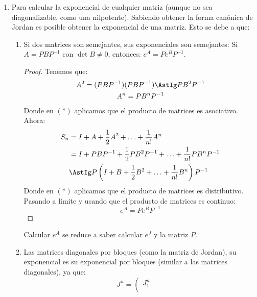 \begin{enumerate}
    \item Para calcular la exponencial de cualquier matriz (aunque no sea diagonalizable, como una nilpotente). Sabiendo obtener la forma canónica de Jordan es posible obtener la exponencial de una matriz. Esto se debe a que:
        \begin{enumerate}
            \item Si dos matrices son semejantes, sus exponenciales son semejantes:
                Si $A = PBP^{-1}$ con $\det B \neq 0$, entonces: $e^A = Pe^BP^{-1}$.



                \begin{proof}
                    Tenemos que:
                    \begin{gather*}
                        A^2 = (PBP^{-1})(PBP^{-1}) \AstIg PB^2 P^{-1} \\
                        A^n = PB^n P^{-1}
                    \end{gather*}
                    Donde en $(\ast)$ aplicamos que el producto de matrices es asociativo. Ahora:
                    \begin{align*}
                        S_n &= I + A + \dfrac{1}{2}A^2 + \ldots + \dfrac{1}{n!} A^n \\
                            &= I + PBP^{-1} + \dfrac{1}{2} PB^2P^{-1} + \ldots + \dfrac{1}{n!}PB^nP^{-1} \\
                            &\AstIg P\left(I + B + \dfrac{1}{2}B^2 + \ldots + \dfrac{1}{n!}B^n\right)  P^{-1}
                    \end{align*}
                    Donde en $(\ast)$ aplicamos que el producto de matrices es distributivo. Pasando a límite y usando que el producto de matrices es continuo:
                    \begin{equation*}
                        e^A = Pe^B P^{-1}
                    \end{equation*}
                \end{proof}
                Calcular $e^A$ se reduce a saber calcular $e^J$ y la matriz $P$.
            \item Las matrices diagonales por bloques (como la matriz de Jordan), su exponencial es su exponencial por bloques (similar a las matrices diagonales), ya que:
                \begin{equation*}
                    J^n = \left(\begin{array}{ccc}
                            J_1^n & & \\

\end{array}
\end{equation*}
\end{enumerate}
\end{enumerate}
